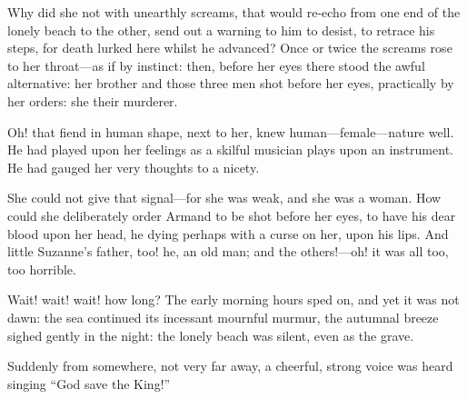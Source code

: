 Why did she not with unearthly screams, that would re-echo from one end of the lonely beach to the other, send out a warning to him to desist, to retrace his steps, for death lurked here whilst he advanced? Once or twice the screams rose to her throat---as if by instinct: then, before her eyes there stood the awful alternative: her brother and those three men shot before her eyes, practically by her orders: she their murderer.

Oh! that fiend in human shape, next to her, knew human---female---nature well. He had played upon her feelings as a skilful musician plays upon an instrument. He had gauged her very thoughts to a nicety.

She could not give that signal---for she was weak, and she was a woman. How could she deliberately order Armand to be shot before her eyes, to have his dear blood upon her head, he dying perhaps with a curse on her, upon his lips. And little Suzanne's father, too! he, an old man; and the others!---oh! it was all too, too horrible.

Wait! wait! wait! how long? The early morning hours sped on, and yet it was not dawn: the sea continued its incessant mournful murmur, the autumnal breeze sighed gently in the night: the lonely beach was silent, even as the grave.

Suddenly from somewhere, not very far away, a cheerful, strong voice was heard singing \enquote{God save the King!}